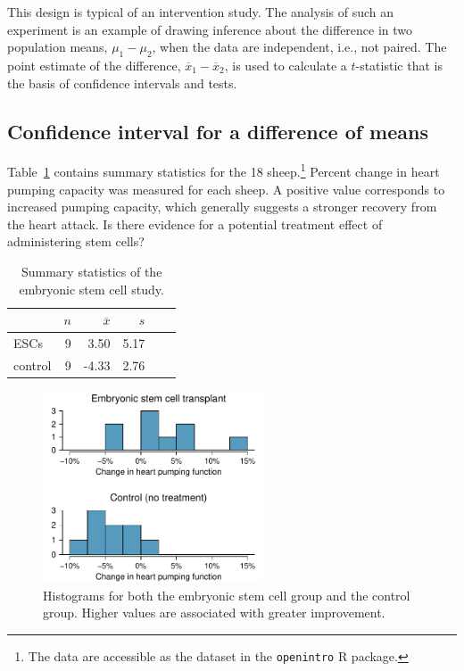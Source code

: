 
This design is typical of an intervention study. The analysis of such an experiment is an example of drawing inference about the difference in two population means, $\mu_1 - \mu_2$, when the data are independent, i.e., not paired. The point estimate of the difference, $\overline{x}_1 - \overline{x}_2$, is used to calculate a $t$-statistic that is the basis of confidence intervals and tests.


\subsection{Confidence interval for a difference of means}
\label{confidenceIntervalDifferenceMeans}


Table~\ref{summaryStatsForSheepHeartDataWhoReceivedMiceESCs} contains summary statistics for the 18 sheep.\footnote{The data are accessible as the dataset  in the \texttt{openintro} \textsf{R} package.}  Percent change in heart pumping capacity was measured for each sheep. A positive value corresponds to increased pumping capacity, which generally suggests a stronger recovery from the heart attack.  Is there evidence for a potential treatment effect of administering stem cells?


\begin{table}[h]
\centering
\begin{tabular}{l rrrrr}
\hline
\hspace{10mm}	& $n$	& $\overline{x}$	& $s$  	 \\
\hline
ESCs		& 9		& 3.50		& 5.17  	\\
control		& 9		& -4.33		& 2.76  	 \\
\hline
\end{tabular}
\caption{Summary statistics of the embryonic stem cell study.}
\label{summaryStatsForSheepHeartDataWhoReceivedMiceESCs}
\end{table}

\begin{figure}[h]
	\centering
	\includegraphics[width=0.58\textwidth]{ch_inference_for_means_oi_biostat/figures/stemCellTherapyForHearts/stemCellTherapyForHearts}
	\caption{Histograms for both the embryonic stem cell group and the control group. Higher values are associated with greater improvement.}
	\label{stemCellTherapyForHearts}
\end{figure}

